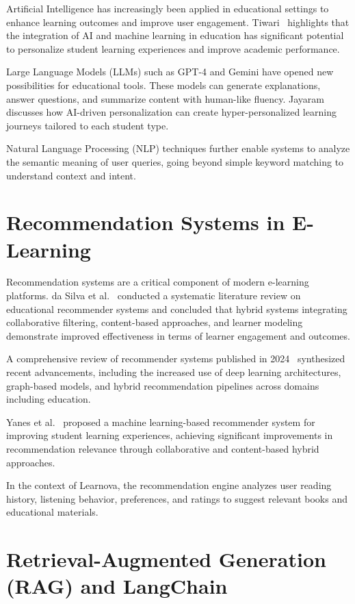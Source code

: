 Artificial Intelligence has increasingly been applied in educational settings
to enhance learning outcomes and improve user engagement. Tiwari~\cite{tiwari2023}
highlights that the integration of AI and machine learning in education has
significant potential to personalize student learning experiences and improve
academic performance.

Large Language Models (LLMs) such as GPT-4 and Gemini have opened new
possibilities for educational tools. These models can generate explanations,
answer questions, and summarize content with human-like fluency. Jayaram~\cite{jayaram2024}
discusses how AI-driven personalization can create hyper-personalized
learning journeys tailored to each student type.

Natural Language Processing (NLP) techniques further enable systems to
analyze the semantic meaning of user queries, going beyond simple keyword
matching to understand context and intent.

\section{Recommendation Systems in E-Learning}
\label{sec:recsys}

Recommendation systems are a critical component of modern e-learning
platforms. da Silva et al.~\cite{dasilva2023} conducted a systematic
literature review on educational recommender systems and concluded that
hybrid systems integrating collaborative filtering, content-based approaches,
and learner modeling demonstrate improved effectiveness in terms of learner
engagement and outcomes.

A comprehensive review of recommender systems published in 2024~\cite{recsysreview2024}
synthesized recent advancements, including the increased use of deep learning
architectures, graph-based models, and hybrid recommendation pipelines
across domains including education.

Yanes et al.~\cite{yanes2020} proposed a machine learning-based recommender
system for improving student learning experiences, achieving significant
improvements in recommendation relevance through collaborative and
content-based hybrid approaches.

In the context of Learnova, the recommendation engine analyzes user reading
history, listening behavior, preferences, and ratings to suggest relevant
books and educational materials.

\section{Retrieval-Augmented Generation (RAG) and LangChain}
\label{sec:rag}

